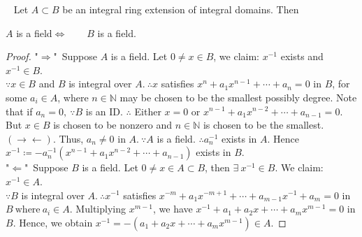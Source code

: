 \documentclass[12pt,a4paper,footinclude=true,headinclude=true]{scrbook} %
\newenvironment{lemma}[2][]
{\renewcommand\theinnercustomlemma{#2}\innercustomlemma[#1]
\begin{mdframed}[backgroundcolor=gray!20]\ }
{\end{mdframed}\endinnercustomprop}
\begin{document}
\begin{lemma}{133}
    Let $A\subset B$ be an integral ring extension of integral domains. Then\\ \centerline{$A$ is a field\qquad $\Longleftrightarrow\qquad B$ is a field.\qquad [AM, 5.7]}
\end{lemma}
\begin{proof}
    "$\Rightarrow$"\ Suppose $A$ is a field. Let $0\neq x\in B$, we claim: $x^{-1}$ exists and $x^{-1}\in B$.\\
    $\because x\in B$ and $B$ is integral over $A.\ \therefore x$ satisfies  $x^n+a_1x^{n-1}+ \cdots+a_n=0$ in $B$, for some $a_i\in A$, where $n\in\mathbb{N}$ may be chosen to be the smallest possibly degree. Note that if $a_n=0,\ \because B$ is an ID. $\therefore$ Either $x=0$ or $x^{n-1}+a_1x^{n-2}+\cdots+a_{n-1}= 0$. But $x\in B$ is chosen to be nonzero and $n\in\mathbb{N}$ is chosen to be the smallest. $(\to\gets)$. Thus, $a_n\neq0$ in $A.\ \because A$ is a field. $\therefore a_n^{-1}$ exists in $A$. Hence $x^{-1}\coloneqq-a_n^{-1}(x^{n-1}+a_1x^{n-2}+\cdots+a_{n-1})$ exists in $B$.\\
    "$\Leftarrow$"\ Suppose $B$ is a field. Let $0\neq x\in A\subset B$, then $\exists\ x^{-1}\in B$. We claim: $x^{-1}\in A$. \\
    $\because B$ is integral over $A.\ \therefore x^{-1}$ satisfies $x^{-m}+a_1x^{-m+1}+ \cdots+a_{m-1}x^{-1}+a_m=0$ in $B\ \text{where}\ a_i\in A$. Multiplying $x^{m-1}$, we have $x^{-1}+a_1+a_2x+ \cdots+a_mx^{m-1}=0$ in $B$. Hence, we obtain  $x^{-1}=-(a_1+a_2x+\cdots+a_mx^{m-1})\in A$.  
\end{proof}
\end{document}
